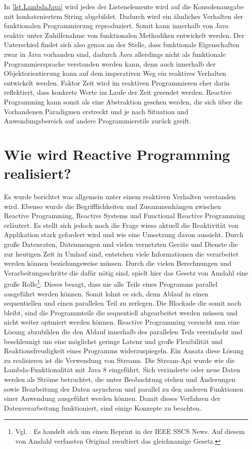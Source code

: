 In \ref{lst.LambdaJava} wird jedes der Listenelemente wird auf die Konsolenausgabe mit konkateniertem String abgebildet. Dadurch wird ein ähnliches Verhalten der funktionalen Programmierung reproduziert. Somit kann innerhalb von Java reaktiv unter Zuhilfenahme von funktionalen Methodiken entwickelt werden. Der Unterschied findet sich also genau an der Stelle, dass funktionale Eigenschaften zwar in Java vorhanden sind, dadurch Java allerdings nicht als funktionale Programmiersprache verstanden werden kann, denn auch innerhalb der Objektorientierung kann auf dem imperativen Weg ein reaktives Verhalten entwickelt werden. Faktor Zeit wird im reaktiven Programmieren eher darin reflektiert, dass konkrete Werte im Laufe der Zeit gesendet werden. Reactive Programming kann somit als eine Abstraktion gesehen werden, die sich über die Vorhandenen Paradigmen erstreckt und je nach Situation und Anwendungsbereich auf andere Programmierstile zurück greift. 

\section{Wie wird Reactive Programming realisiert?}
Es wurde berichtet was allgemein unter einem reaktiven Verhalten verstanden wird. Ebenso wurde die Begrifflichkeiten und Zusammenhängen zwischen Reactive Programming, Reactive Systems und Functional Reactive Programming erläutert. Es stellt sich jedoch noch die Frage wieso aktuell die Reaktivität von Applikation stark gefordert wird und wie eine Umsetzung davon aussieht. Durch große Datenraten, Datenmengen und vielen vernetzten Geräte und Dienste die zur heutigen Zeit in Umlauf sind, entstehen viele Informationen die verarbeitet werden können beziehungsweise müssen. Durch die vielen Berechnungen und Verarbeitungsschritte die dafür nötig sind, spielt hier das Gesetz von Amdahl eine große Rolle\footnote{Vgl. \cite{Amdahl.}. Es handelt sich um einen Reprint in der IEEE SSCS News. Auf diesem von Amdahl verfassten Original resultiert das gleichnamige Gesetz.}. Dieses besagt, dass nie alle Teile eines Programms parallel ausgeführt werden können. Somit lohnt es sich, denn Ablauf in einen sequentiellen und einen parallelen Teil zu zerlegen. Die Blockade die somit noch bleibt, sind die Programmteile die sequentiell abgearbeitet werden müssen und nicht weiter optmiert werden können. Reactive Programming versucht nun eine Lösung abzubilden die den Ablauf innerhalb des parallelen Teils vereinfacht und beschleunigt um eine möglichst geringe Latenz und große Flexibilität und Reaktionsfreudigkeit eines Programms widerzuspiegeln. Ein Ansatz diese Lösung zu realisieren ist die Verwendung von Streams. Die Stream-Api wurde wie die Lambda-Funktionalität mit Java 8 eingeführt. Sich veränderte oder neue Daten werden als Ströme betrachtet, die unter Beobachtung stehen und Änderungen sowie Bearbeitung der Daten asynchron und parallel zu den anderen Funktionen einer Anwendung ausgeführt werden können. Damit dieses Verfahren der Datenverarbeitung funktioniert, sind einige Konzepte zu beachten.
